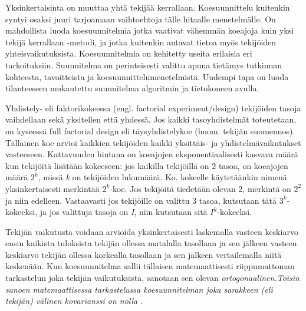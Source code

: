 \documentclass[12pt,a4paper,finnish]{tutthesis}
\begin{document}
Yksinkertaisinta on muuttaa yhtä tekijää kerrallaan. Koesuunnittelu kuitenkin syntyi
osaksi juuri tarjoamaan vaihtoehtoja tälle hitaalle menetelmälle. On mahdollista luoda
koesuunnitelmia jotka vaativat vähemmän koeajoja kuin yksi tekijä kerrallaan -metodi,
ja jotka kuitenkin antavat tietoa myös tekijöiden yhteisvaikutuksista.
Koesuunnitelmia on kehitetty useita erilaisia eri tarkoituksiin.
Suunnitelma on perinteisesti valittu apuna tietämys
tutkinnan kohteesta, tavoitteista ja koesuunnittelumenetelmistä.
Uudempi tapa on luoda tilanteeseen
mukautettu suunnitelma algoritmin ja tietokoneen avulla.

Yhdistely- eli faktorikokeessa (engl. factorial experiment/design) tekijöiden
tasoja vaihdellaan sekä yksitellen että yhdessä. Jos kaikki tasoyhdistelmät
toteutetaan, on kyseessä full factorial design eli täysyhdistelykoe (huom.
tekijän suomennos). Tällainen koe arvioi kaikkien tekijöiden kaikki yksittäis-
ja yhdistelmävaikutukset vasteeseen. Kattavuuden hintana on koeajojen
eksponentiaalisesti kasvava määrä kun tekijöitä lisätään kokeeseen: jos kaikilla
tekijöillä on 2 tasoa, on koeajojen määrä \(2^k\),
missä \textit{k} on
tekijöiden lukumäärä. Ko. kokeelle käytetäänkin nimenä yksinkertaisesti
merkintää \(2^k\)-koe.
Jos tekijöitä tiedetään olevan 2, merkintä on
\(2^2\) ja niin edelleen. Vastaavasti jos tekijöille on valittu 3 tasoa,
kutsutaan tätä \(3^k\)-kokeeksi, ja jos valittuja tasoja on \textit{I},
niin kutsutaan sitä \(I^k\)-kokeeksi.

Tekijän vaikutusta voidaan arvioida yksinkertaisesti laskemalla vasteen keskiarvo
ensin kaikista tuloksista tekijän ollessa matalalla tasollaan ja sen jälkeen
vasteen keskiarvo tekijän ollessa korkealla tasollaan ja sen jälkeen
vertailemalla niitä keskenään. Kun koesuunnitelma sallii tällaisen matemaattisesti
riippumattoman tarkastelun joka tekijän vaikutuksista, sanotaan
sen olevan \em ortogonaalinen.\em Toisin sanoen matemaattisessa
tarkastelussa koesuunnitelman joka sarakkeen (eli tekijän) välinen kovarianssi
on nolla \parencite{barker2005}.
\end{document}
